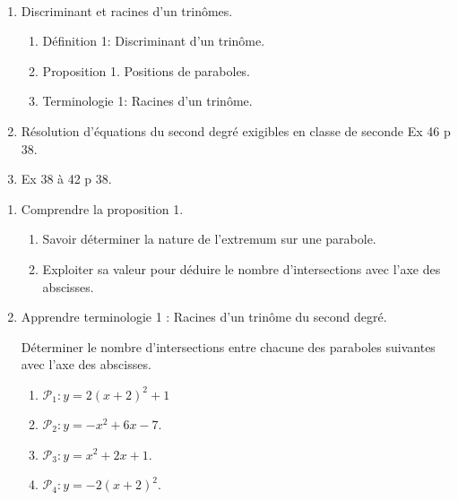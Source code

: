 \documentclass[a4paper,11pt]{article}
\title{}
\author{}
\date{}
\theoremstyle{break}
\newcounter{numero}
\newcommand{\exo}{
  \addtocounter{numero}{1}%
  \textbf{\underline{Exercice \arabic{numero}:}}\quad}
\begin{document}
  \setlength{\unitlength}{1mm}
  \setlength\parindent{0mm}
  
  
  ~
  \medskip
  
  \begin{enumerate}
    
    \item Discriminant et racines d'un trinômes.
    \begin{enumerate}
      \item Définition 1: Discriminant d'un trinôme.
      \item Proposition 1. Positions de paraboles.
      \item Terminologie 1: Racines d'un trinôme.
    \end{enumerate}
    \item Résolution d'équations du second degré exigibles en classe de seconde Ex 46 p 38.
    \item Ex 38 à 42 p 38.
  \end{enumerate}
  
  \begin{Dev*}
    
    \begin{enumerate}
      
      \item Comprendre la proposition 1.
      \begin{enumerate}
	\item Savoir déterminer la nature de l'extremum sur une parabole.
	\item Exploiter sa valeur pour déduire le nombre d'intersections 
	avec l'axe des abscisses.
      \end{enumerate}
      \item Apprendre terminologie 1 : Racines d'un trinôme du second degré.
      \vspace{0.5cm}
      
      \begin{dm}
	
	Déterminer le nombre d'intersections entre chacune des paraboles suivantes
	avec l'axe des abscisses.
	\begin{enumerate}
	  \item $\mathcal{P}_1:y=2(x+2)^2+1$
	  \item $\mathcal{P}_2:y=-x^2+6x-7$.%
	  \item $\mathcal{P}_3:y=x^2+2x+1$.
	  \item $\mathcal{P}_4:y=-2(x+2)^2$.
	\end{enumerate} 
      \end{dm}
      
      
      
    \end{enumerate}
  \end{Dev*}
  
  
  
  
\end{document}
